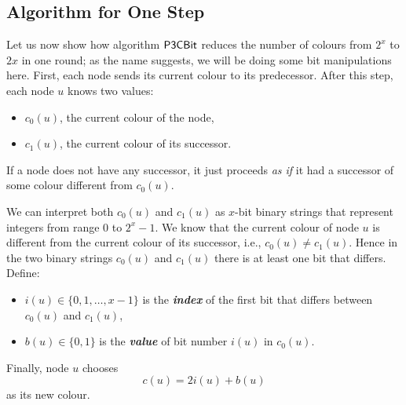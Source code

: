 \subsection{Algorithm for One Step}

Let us now show how algorithm $\textup{\sffamily P3CBit}$ reduces the number of colours from $2^x$ to $2x$ in one round; as the name suggests, we will be doing some bit manipulations here. First, each node sends its current colour to its predecessor. After this step, each node $u$ knows two values:
\begin{itemize}[noitemsep]
    \item $c_0(u)$, the current colour of the node,
    \item $c_1(u)$, the current colour of its successor.
\end{itemize}
If a node does not have any successor, it just proceeds \emph{as if} it had a successor of some colour different from $c_0(u)$.

We can interpret both $c_0(u)$ and $c_1(u)$ as $x$-bit binary strings that represent integers from range $0$ to $2^x-1$. We know that the current colour of node $u$ is different from the current colour of its successor, i.e., $c_0(u) \ne c_1(u)$. Hence in the two binary strings $c_0(u)$ and $c_1(u)$ there is at least one bit that differs. Define:
\begin{itemize}
    \item $i(u) \in \{0,1,\dotsc,x-1\}$ is the \emph{\textbf{index}} of the first bit that differs between $c_0(u)$ and $c_1(u)$,
    \item $b(u) \in \{0,1\}$ is the \emph{\textbf{value}} of bit number $i(u)$ in $c_0(u)$.
\end{itemize}
Finally, node $u$ chooses
\[
    c(u) = 2i(u) + b(u)
\]
as its new colour.


